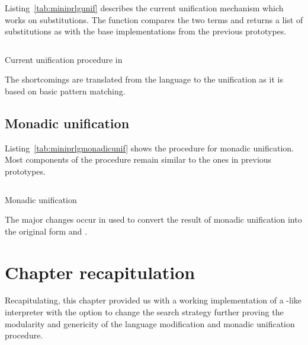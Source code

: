 \documentclass[thesis-solanki.tex]{files}
\begin{document}
Listing~\ref{tab:miniprlgunif} describes the current unification mechanism which works on substitutions.
The  function compares the two terms and returns a list of substitutions as with the base
implementations from the previous prototypes.

\begin{code-list}[H]
\begin{singlespace}
  \inputminted[linenos, firstline=67, lastline=95]{haskell}{haskell-proto3-pentyl-skater.hs}
\end{singlespace}
\caption{Current unification procedure in  \cite{website:mini-prolog-hugs98}}
\label{tab:miniprlgunif}
\end{code-list}

The shortcomings are translated from the language to the unification as it is based on basic pattern matching.

\subsection{Monadic unification}
Listing~\ref{tab:miniprlgmonadicunif} shows the procedure for monadic unification. Most components of the procedure remain similar to the ones
in previous prototypes.
\begin{code-list}[H]
\begin{singlespace}
  \inputminted[linenos, firstline=1, lastline=42]{haskell}{haskell-proto3-bevy-icebox.hs}
\end{singlespace}
\caption{Monadic unification}
\label{tab:miniprlgmonadicunif}
\end{code-list}

The major changes occur in  used to convert the result of monadic unification into
the original  form and .

\section{Chapter recapitulation}
Recapitulating, this chapter provided us with a working implementation of a -like interpreter with
the option to change the search strategy further proving the modularity and genericity of the language modification
and monadic unification procedure.
\end{document}
